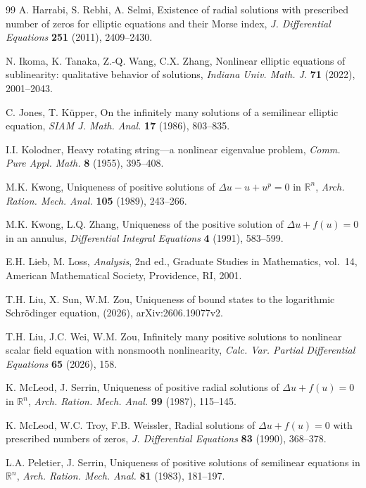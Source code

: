 \documentclass[11pt]{article}
\begin{document}
\begin{thebibliography}{99}
A. Harrabi, S. Rebhi, A. Selmi,
Existence of radial solutions with prescribed number of zeros for elliptic equations and their Morse index, \emph{J. Differential Equations} \textbf{251} (2011), 2409--2430.


 N. Ikoma, K. Tanaka, Z.-Q. Wang, C.X. Zhang,
Nonlinear elliptic equations of sublinearity: qualitative behavior of solutions,
\emph{Indiana Univ. Math. J.} \textbf{71} (2022), 2001--2043.

 C. Jones, T. K\"upper,
On the infinitely many solutions of a semilinear elliptic equation,
\emph{SIAM J. Math. Anal.} \textbf{17} (1986), 803--835.

 I.I. Kolodner,
Heavy rotating string---a nonlinear eigenvalue problem,
\emph{Comm. Pure Appl. Math.} \textbf{8} (1955), 395--408.

 M.K. Kwong,
{Uniqueness of positive solutions of $\Delta u-u+u^p=0$ in $\mathbb R^n$,}
\emph{Arch. Ration. Mech. Anal.} \textbf{105} (1989), 243--266.

 M.K. Kwong, L.Q. Zhang,
Uniqueness of the positive solution of $\Delta u+f(u)=0$ in an annulus,
 \emph{Differential Integral Equations} \textbf{4} (1991), 583--599.

  E.H. Lieb, M. Loss,
{\emph{Analysis}, 2nd ed., Graduate Studies in Mathematics, vol.~14,
American Mathematical Society, Providence, RI, 2001.}

 T.H. Liu, X. Sun, W.M. Zou,
Uniqueness of bound states to the logarithmic Schr\"odinger equation, (2026),
{arXiv:2606.19077v2}.

 T.H. Liu, J.C. Wei, W.M. Zou,
Infinitely many positive solutions to nonlinear scalar field equation with nonsmooth nonlinearity, \emph{Calc. Var. Partial Differential Equations} \textbf{65} (2026), {158}.

 K. McLeod, J. Serrin,
{Uniqueness of positive radial solutions of $\Delta u+f(u)=0$ in $\mathbb R^n$,}
\emph{Arch. Ration. Mech. Anal.} \textbf{99} (1987), 115--145.

 K. McLeod, W.C. Troy, F.B. Weissler,
Radial solutions of $\Delta u+f(u)=0$ with prescribed numbers of zeros,
\emph{J. Differential Equations} \textbf{83} (1990), 368--378.

 L.A. Peletier, J. Serrin,
{Uniqueness of positive solutions of semilinear equations in $\mathbb R^n$,}
\emph{Arch. Ration. Mech. Anal.} \textbf{81} (1983), 181--197.


\end{thebibliography}
\end{document}

